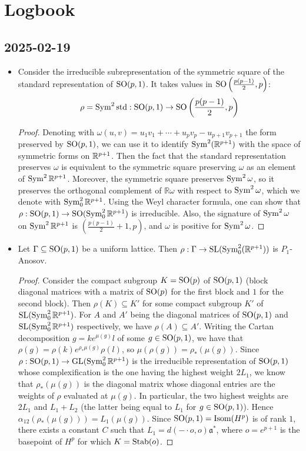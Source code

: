 \documentclass{report}
\begin{document}
\chapter{Logbook}
\setcounter{secnumdepth}{0}
\section{2025-02-19}
\begin{itemize}
    \item Consider the irreducible subrepresentation of the symmetric square of the standard representation of $\operatorname{{\mathrm{SO}}}(p,1)$.
    It takes values in $\operatorname{{\mathrm{SO}}}\left(\frac{p(p-1)}{2}, p\right)$:
    \[
    \rho = \operatorname{Sym}^2 \mathrm{std}: \operatorname{{\mathrm{SO}}}(p,1) \to \operatorname{{\mathrm{SO}}}\left(\frac{p(p-1)}{2}, p\right)
    \]
    \begin{proof}
        Denoting with $\omega(u,v) = u_1 v_1 + \cdots + u_p v_p - u_{p+1}v_{p+1}$ the form preserved by $\operatorname{{\mathrm{SO}}}(p,1)$, we can use it to identify $\operatorname{Sym}^2(\mathbb{R}^{p+1})$ with the space of symmetric forms on $\mathbb{R}^{p+1}$.
        Then the fact that the standard representation preserves $\omega$ is equivalent to the symmetric square preserving $\omega$ as an element of $\operatorname{Sym}^2{\mathbb R^{p+1}}$.
        Moreover, the symmetric square preserves $\operatorname{Sym}^2 \omega$, so it preserves the orthogonal complement of $\mathbb R \omega$ with respect to $\operatorname{Sym}^2 \omega$, which we denote with $\operatorname{Sym}^2_0 \mathbb R^{p+1}$.
        Using the Weyl character formula, one can show that $\rho: \operatorname{{\mathrm{SO}}}(p,1) \to \operatorname{{\mathrm{SO}}}(\operatorname{Sym}^2_0 \mathbb R^{p+1})$ is irreducible.
        Also, the signature of $\operatorname{Sym}^2 \omega$ on $\operatorname{Sym}^2 \mathbb R^{p+1}$ is $\left(\frac{p(p-1)}{2} + 1, p\right)$, and $\omega$ is positive for $\operatorname{Sym}^2 \omega$.
    \end{proof}
    \item Let $\Gamma \subseteq \operatorname{{\mathrm{SO}}}(p,1)$ be a uniform lattice. Then
    $\rho: \Gamma \to \operatorname{{\mathrm{SL}}}(\operatorname{Sym}_0^2(\mathbb R^{p+1}))$ is $P_1$-Anosov.
    \begin{proof}
        Consider the compact subgroup $K = \operatorname{{\mathrm{SO}}}(p)$ of $\operatorname{{\mathrm{SO}}}(p,1)$ (block diagonal matrices with a matrix of $\operatorname{{\mathrm{SO}}}(p)$ for the first block and $1$ for the second block).
        Then $\rho(K) \subseteq K'$ for some compact subgroup $K'$ of $\operatorname{{\mathrm{SL}}}(\operatorname{Sym}^2_0 \mathbb R^{p+1})$.
        For $A$ and $A'$ being the diagonal matrices of $\operatorname{{\mathrm{SO}}}(p,1)$ and $\operatorname{{\mathrm{SL}}}(\operatorname{Sym}^2_0 \mathbb R^{p+1})$ respectively, we have $\rho(A) \subseteq A'$.
        Writing the Cartan decomposition $g = k e^{\mu(g)} l$ of some $g \in \operatorname{{\mathrm{SO}}}(p,1)$, we have that $\rho(g) = \rho(k) e^{\rho_* \mu(g)} \rho(l)$, so $\mu(\rho(g)) = \rho_*(\mu(g))$.
        Since $\rho: \operatorname{{\mathrm{SO}}}(p,1) \to \operatorname{{\mathrm{GL}}}(\operatorname{Sym}^2_0 \mathbb R^{p+1})$ is the irreducible representation of $\operatorname{{\mathrm{SO}}}(p,1)$ whose complexification is the one having the highest weight $2L_1$, we know that $\rho_*(\mu(g))$ is the diagonal matrix whose diagonal entries are the weights of $\rho$ evaluated at $\mu(g)$.
        In particular, the two highest weights are $2L_1$ and $L_1 + L_2$ (the latter being equal to $L_1$ for $g \in \operatorname{{\mathrm{SO}}}(p,1)$).
        Hence $\alpha_{12}(\rho_*(\mu(g))) = L_1(\mu(g))$.
        Since $\operatorname{{\mathrm{SO}}}(p,1) = \operatorname{Isom}(H^p)$ is of rank $1$, there exists a constant $C$ such that $L_1 = d(- \cdot o, o) \mathfrak a^*$,
        where $o = e^{p+1}$ is the basepoint of $H^p$ for which $K = \operatorname{Stab}(o)$.
        

\end{proof}
\end{itemize}
\end{document}
